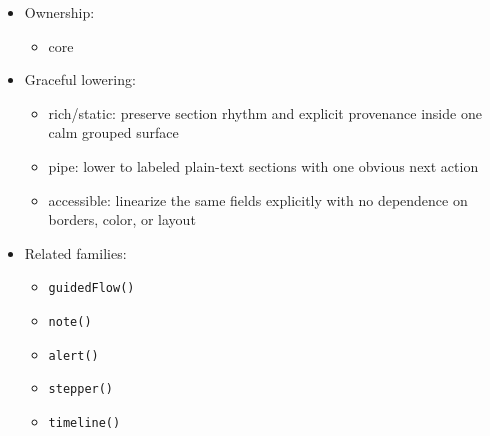 \begin{itemize}
  \begin{itemize}
  \tightlist
  \item
    keep the title as the recommendation or explanation itself, not a vague marketing headline
  \item
    make \texttt{[\allowbreak{}A\allowbreak{}I\allowbreak{}]} or equivalent provenance visible
  \item
    separate rationale, evidence, and next action into distinct sections instead of mixing them together
  \item
    governance text should clarify review posture without becoming the dominant content
  \end{itemize}
\item
  Ownership:

  \begin{itemize}
  \tightlist
  \item
    core
  \end{itemize}
\item
  Graceful lowering:

  \begin{itemize}
  \tightlist
  \item
    rich/static: preserve section rhythm and explicit provenance inside one calm grouped surface
  \item
    pipe: lower to labeled plain-text sections with one obvious next action
  \item
    accessible: linearize the same fields explicitly with no dependence on borders, color, or layout
  \end{itemize}
\item
  Related families:

  \begin{itemize}
  \tightlist
  \item
    \texttt{g\allowbreak{}u\allowbreak{}i\allowbreak{}d\allowbreak{}e\allowbreak{}d\allowbreak{}F\allowbreak{}l\allowbreak{}o\allowbreak{}w\allowbreak{}(\allowbreak{})}
  \item
    \texttt{n\allowbreak{}o\allowbreak{}t\allowbreak{}e\allowbreak{}(\allowbreak{})}
  \item
    \texttt{a\allowbreak{}l\allowbreak{}e\allowbreak{}r\allowbreak{}t\allowbreak{}(\allowbreak{})}
  \item
    \texttt{s\allowbreak{}t\allowbreak{}e\allowbreak{}p\allowbreak{}p\allowbreak{}e\allowbreak{}r\allowbreak{}(\allowbreak{})}
  \item
    \texttt{t\allowbreak{}i\allowbreak{}m\allowbreak{}e\allowbreak{}l\allowbreak{}i\allowbreak{}n\allowbreak{}e\allowbreak{}(\allowbreak{})}
  \end{itemize}
\end{itemize}

